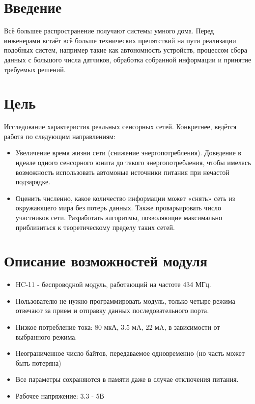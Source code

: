 \tableofcontents

\newpage 

\section{Введение}
Всё большее распространение получают системы умного дома. Перед инженерами встаёт всё больше технических препятствий на пути реализации подобных систем, например такие как автономность устройств, процессом сбора данных с большого числа датчиков, обработка собранной информации и принятие требуемых решений. 

\section{Цель}

Исследование характеристик реальных сенсорных сетей. Конкретнее, ведётся работа по следующим направлениям:

\begin{itemize}

\item Увеличение время жизни сети (снижение энергопотребления). Доведение в идеале одного сенсорного юнита до такого энергопотребления, чтобы имелась возможность использовать автомоные источники питания при нечастой подзарядке.

\item Оценить численно, какое количество информации может «снять» сеть из окружающего мира без потерь данных. Также проварьировать число участников сети. Разработать алгоритмы, позволяющие максимально приблизиться к теоретическому пределу таких сетей.

\end{itemize}

\section{Описание возможностей модуля}

\begin{itemize}

\item HC-11 - беспроводной модуль, работающий на частоте 434 МГц.

\item Пользователю не нужно программировать модуль, только четыре режима отвечают за прием и отправку данных последовательного порта.

\item Низкое потребление тока: 80 мкА, 3.5 мA, 22 мA, в зависимости от выбранного режима.

\item Неограниченное число байтов, передаваемое одновременно (но часть может быть потеряна)


\item Все параметры сохраняются в памяти даже в случае отключения питания.


\item Рабочее напряжение: 3.3 - 5В

\end{itemize}


